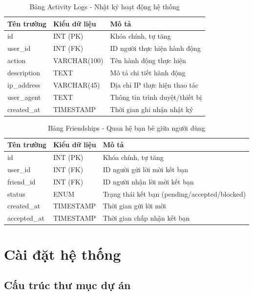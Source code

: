 \documentclass[a4paper,13pt]{extreport}
\begin{document}
\begin{table}[H]
\centering
\caption{Bảng Activity Logs - Nhật ký hoạt động hệ thống}
\begin{tabular}{|l|l|l|}
\hline
\textbf{Tên trường} & \textbf{Kiểu dữ liệu} & \textbf{Mô tả} \\
\hline
id & INT (PK) & Khóa chính, tự tăng \\
user\_id & INT (FK) & ID người thực hiện hành động \\
action & VARCHAR(100) & Tên hành động thực hiện \\
description & TEXT & Mô tả chi tiết hành động \\
ip\_address & VARCHAR(45) & Địa chỉ IP thực hiện thao tác \\
user\_agent & TEXT & Thông tin trình duyệt/thiết bị \\
created\_at & TIMESTAMP & Thời gian ghi nhận nhật ký \\
\hline
\end{tabular}
\end{table}

\begin{table}[H]
\centering
\caption{Bảng Friendships - Quan hệ bạn bè giữa người dùng}
\begin{tabular}{|l|l|l|}
\hline
\textbf{Tên trường} & \textbf{Kiểu dữ liệu} & \textbf{Mô tả} \\
\hline
id & INT (PK) & Khóa chính, tự tăng \\
user\_id & INT (FK) & ID người gửi lời mời kết bạn \\
friend\_id & INT (FK) & ID người nhận lời mời kết bạn \\
status & ENUM & Trạng thái kết bạn (pending/accepted/blocked) \\
created\_at & TIMESTAMP & Thời gian gửi lời mời \\
accepted\_at & TIMESTAMP & Thời gian chấp nhận kết bạn \\
\hline
\end{tabular}
\end{table}

\section{Cài đặt hệ thống}

\subsection{Cấu trúc thư mục dự án}
\end{document}
